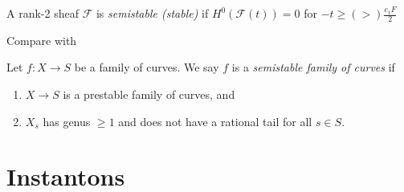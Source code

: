 \begin{definition}
\label{definition-slope-stability}
A rank-2 sheaf $\mathcal{F}$ is
{\it semistable (stable)} if
$H^{0}(\mathcal{F}(t))=0$ for $-t \geq(>)
\frac{c_1F}{2}$
\end{definition}

\noindent
Compare with

\begin{definition}
\label{definition-semistable}
Let $f : X \to S$ be a family of curves.
We say $f$ is a {\it semistable
family of curves} if
\begin{enumerate}
\item $X \to S$ is a prestable family of
curves,
and
\item $X_s$ has genus $\geq 1$ and
does not have a rational tail for all $s \in
S$.
\end{enumerate}
\end{definition}

\section{Instantons}
\label{section-instantons}


